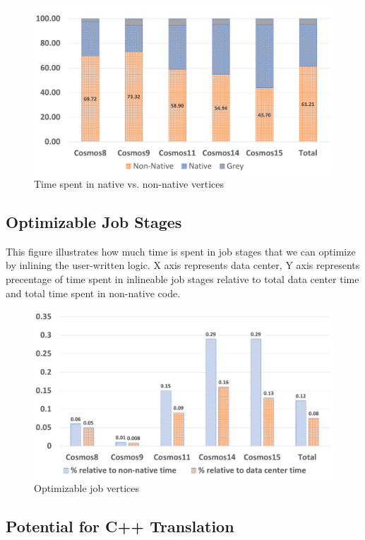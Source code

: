 \begin{figure}[ht]
\includegraphics[scale = 0.7]{graphs/proportions}
\caption{Time spent in native vs. non-native vertices}
\label{fig:nativeVsNonNative}
\end{figure}

\subsection{Optimizable Job Stages}

This figure illustrates how much time is spent in job stages that we can optimize by inlining the user-written logic. X axis represents data center, Y axis represents precentage of time spent in inlineable job stages relative to total data center time and total time spent in non-native code.

\begin{figure}[ht]
\includegraphics[scale=0.8]{graphs/optimizable}
\caption{Optimizable job vertices}
\end{figure}

\subsection{Potential for C++ Translation}

